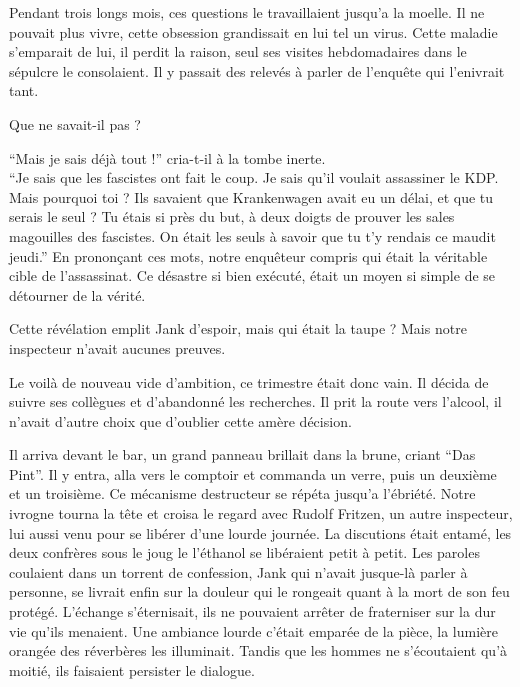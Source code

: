 Pendant trois longs mois, ces questions le travaillaient jusqu'a la moelle.
Il ne pouvait plus vivre, cette obsession grandissait en lui tel un virus.
Cette maladie s'emparait de lui, il perdit la raison, seul ses visites hebdomadaires dans le sépulcre le consolaient.
Il y passait des relevés à parler de l'enquête qui l'enivrait tant.

Que ne savait-il pas ?

\enquote{Mais je sais déjà tout !} cria-t-il à la tombe inerte.\\
\enquote{Je sais que les fascistes ont fait le coup. Je sais qu'il voulait assassiner le KDP.
Mais pourquoi toi ? 
Ils savaient que Krankenwagen avait eu un délai, et que tu serais le seul ?
Tu étais si près du but, à deux doigts de prouver les sales magouilles des fascistes.
On était les seuls à savoir que tu t'y rendais ce maudit jeudi.} 
En prononçant ces mots, notre enquêteur compris qui était la véritable cible de l'assassinat.
Ce désastre si bien exécuté, était un moyen si simple de se détourner de la vérité.

Cette révélation emplit Jank d'espoir, mais qui était la taupe ? Mais notre inspecteur n'avait aucunes preuves. 

Le voilà de nouveau vide d'ambition, ce trimestre était donc vain. 
Il décida de suivre ses collègues et d'abandonné les recherches.
Il prit la route vers l'alcool, il n'avait d'autre choix que d'oublier cette amère décision.

Il arriva devant le bar, un grand panneau brillait dans la brune, criant \enquote{{\tgothfamily Das Pint}}.
Il y entra, alla vers le comptoir et commanda un verre, puis un deuxième et un troisième.
Ce mécanisme destructeur se répéta jusqu'a l'ébriété. 
Notre ivrogne tourna la tête et croisa le regard avec Rudolf Fritzen, un autre inspecteur, lui aussi venu pour se libérer d'une lourde journée.
La discutions était entamé, les deux confrères sous le joug le l'éthanol se libéraient petit à petit. 
Les paroles coulaient dans un torrent de confession, Jank qui n'avait jusque-là parler à personne, se livrait enfin 
sur la douleur qui le rongeait quant à la mort de son feu protégé.
L'échange s'éternisait, ils ne pouvaient arrêter de fraterniser sur la dur vie qu'ils menaient.
Une ambiance lourde c'était emparée de la pièce, la lumière orangée des réverbères les illuminait. 
Tandis que les hommes ne s'écoutaient qu'à moitié, ils faisaient persister le dialogue.

